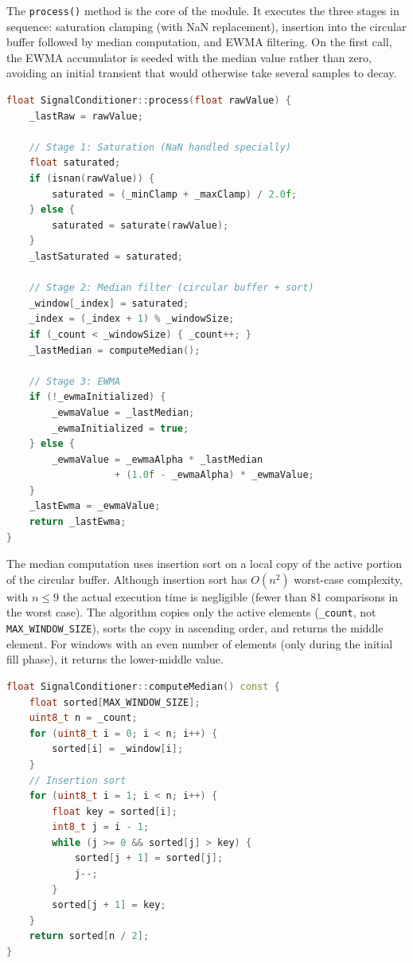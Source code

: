 The \texttt{process()} method is the core of the module. It executes the three stages in sequence: saturation clamping (with NaN replacement), insertion into the circular buffer followed by median computation, and EWMA filtering. On the first call, the EWMA accumulator is seeded with the median value rather than zero, avoiding an initial transient that would otherwise take several samples to decay.

\begin{lstlisting}[language=C++, caption=SignalConditioner::process() --- full pipeline implementation, label=lst:signal_conditioner_process]
float SignalConditioner::process(float rawValue) {
    _lastRaw = rawValue;

    // Stage 1: Saturation (NaN handled specially)
    float saturated;
    if (isnan(rawValue)) {
        saturated = (_minClamp + _maxClamp) / 2.0f;
    } else {
        saturated = saturate(rawValue);
    }
    _lastSaturated = saturated;

    // Stage 2: Median filter (circular buffer + sort)
    _window[_index] = saturated;
    _index = (_index + 1) % _windowSize;
    if (_count < _windowSize) { _count++; }
    _lastMedian = computeMedian();

    // Stage 3: EWMA
    if (!_ewmaInitialized) {
        _ewmaValue = _lastMedian;
        _ewmaInitialized = true;
    } else {
        _ewmaValue = _ewmaAlpha * _lastMedian
                   + (1.0f - _ewmaAlpha) * _ewmaValue;
    }
    _lastEwma = _ewmaValue;
    return _lastEwma;
}
\end{lstlisting}

The median computation uses insertion sort on a local copy of the active portion of the circular buffer. Although insertion sort has $O(n^2)$ worst-case complexity, with $n \leq 9$ the actual execution time is negligible (fewer than 81 comparisons in the worst case). The algorithm copies only the active elements (\texttt{\_count}, not \texttt{MAX\_WINDOW\_SIZE}), sorts the copy in ascending order, and returns the middle element. For windows with an even number of elements (only during the initial fill phase), it returns the lower-middle value.

\begin{lstlisting}[language=C++, caption=Median computation via insertion sort, label=lst:compute_median]
float SignalConditioner::computeMedian() const {
    float sorted[MAX_WINDOW_SIZE];
    uint8_t n = _count;
    for (uint8_t i = 0; i < n; i++) {
        sorted[i] = _window[i];
    }
    // Insertion sort
    for (uint8_t i = 1; i < n; i++) {
        float key = sorted[i];
        int8_t j = i - 1;
        while (j >= 0 && sorted[j] > key) {
            sorted[j + 1] = sorted[j];
            j--;
        }
        sorted[j + 1] = key;
    }
    return sorted[n / 2];
}
\end{lstlisting}

